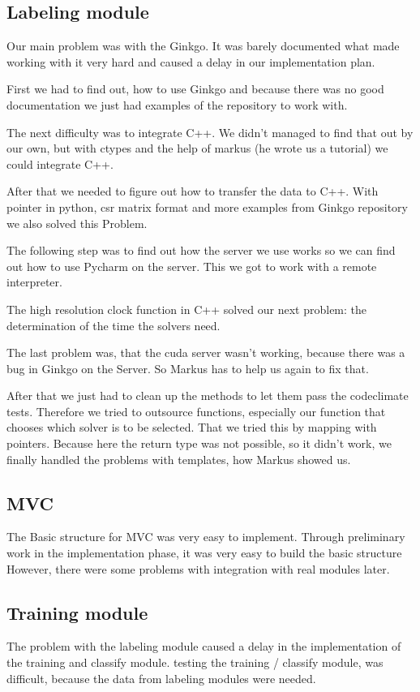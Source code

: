 \documentclass[parskip=full]{scrartcl}
\begin{document}
\subsection{Labeling module}
Our main problem was with the \gls{Ginkgo}. 
It was barely documented what made working with it very hard and caused a delay in our implementation plan. 

First we had to find out, how to use \gls{Ginkgo} and because there was no good documentation we just had examples of the repository to work with.

The next difficulty was to integrate C++.
We didn't managed to find that out by our own, but with ctypes and the help of markus (he wrote us a tutorial) we could integrate C++.

After that we needed to figure out how to transfer the data to C++.
With pointer in python, csr matrix format and more examples from Ginkgo repository we also solved this Problem.

The following step was to find out how the server we use works so we can find out how to use Pycharm on the server.
This we got to work with a remote interpreter.

The high resolution clock function in C++ solved our next problem: the determination of the time the solvers need.

The last problem was, that the cuda server wasn't working, because there was a bug in Ginkgo on the Server.
So Markus has to help us again to fix that.

After that we just had to clean up the methods to let them pass the codeclimate tests.
Therefore we tried to outsource functions, especially our function that chooses which solver is to be selected.
That we tried this by mapping with pointers.
Because here the return type was not possible, so it didn't work, we finally handled the problems with templates, how Markus showed us.


\subsection{MVC}
The Basic structure for MVC was very easy to implement.
Through preliminary work in the implementation phase, it was very easy to build the basic structure 
However, there were some problems with integration with real modules later.
\subsection{Training module}
The problem with the labeling module caused a delay in the implementation of the training and classify module.
testing the training / classify module, was difficult, because the data from labeling modules were needed.
\end{document}
